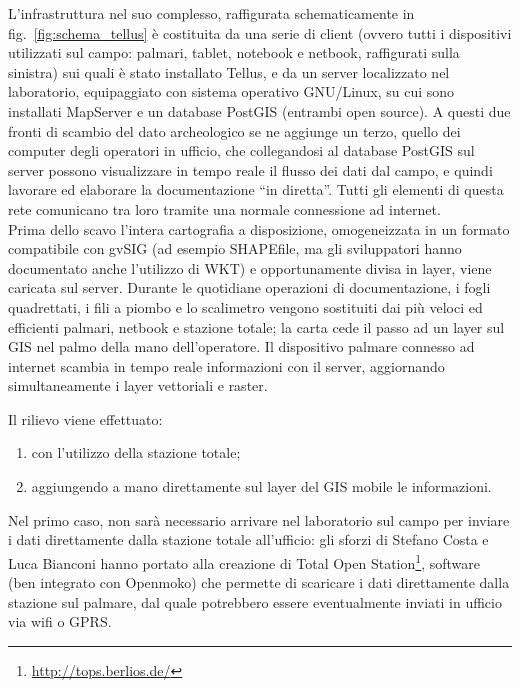 	L'infrastruttura nel suo complesso, raffigurata schematicamente in fig.~\ref{fig:schema_tellus} è costituita da una serie di client (ovvero tutti i dispositivi utilizzati sul campo: palmari, tablet, notebook e netbook, raffigurati sulla sinistra) sui quali è stato installato Tellus, e da un server localizzato nel laboratorio, equipaggiato con sistema operativo GNU/Linux, su cui sono installati MapServer e un database PostGIS (entrambi open source). A questi due fronti di scambio del dato archeologico se ne aggiunge un terzo, quello dei computer degli operatori in ufficio, che collegandosi al database PostGIS sul server possono visualizzare in tempo reale il flusso dei dati dal campo, e quindi lavorare ed elaborare la documentazione ``in diretta''. Tutti gli elementi di questa rete comunicano tra loro tramite una normale connessione ad internet.\\

	Prima dello scavo l'intera cartografia a disposizione, omogeneizzata in un formato compatibile con gvSIG (ad esempio SHAPEfile, ma gli sviluppatori hanno documentato anche l'utilizzo di WKT) e opportunamente divisa in layer, viene caricata sul server. Durante le quotidiane operazioni di documentazione, i fogli quadrettati, i fili a piombo e lo scalimetro vengono sostituiti dai più veloci ed efficienti palmari, netbook e stazione totale; la carta cede il passo ad un layer sul GIS nel palmo della mano dell'operatore. Il dispositivo palmare connesso ad internet scambia in tempo reale informazioni con il server, aggiornando simultaneamente i layer vettoriali e raster.

	Il rilievo viene effettuato:
	
	\begin{enumerate}
		\item con l'utilizzo della stazione totale;
		\item aggiungendo a mano direttamente sul layer del GIS mobile le informazioni.
	\end{enumerate}
	
	Nel primo caso, non sarà necessario arrivare nel laboratorio sul campo per inviare i dati direttamente dalla stazione totale all'ufficio: gli sforzi di Stefano Costa e Luca Bianconi hanno portato alla creazione di Total Open Station\footnote{\href{http://tops.berlios.de/}{http://tops.berlios.de/}}, software (ben integrato con Openmoko) che permette di scaricare i dati direttamente dalla stazione sul palmare, dal quale potrebbero essere eventualmente inviati in ufficio via wifi o GPRS.

